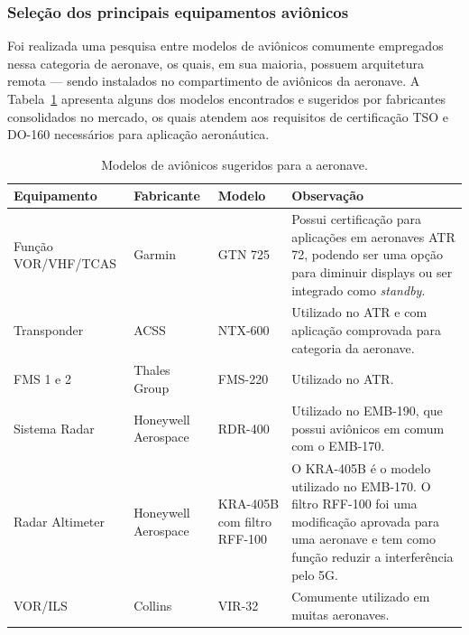 \subsubsection{Seleção dos principais equipamentos aviônicos}

Foi realizada uma pesquisa entre modelos de aviônicos comumente
empregados nessa categoria de aeronave, os quais, em sua maioria, possuem
arquitetura remota --- sendo instalados no compartimento de aviônicos da
aeronave. A Tabela~\ref{tab:modelos_avionicos} apresenta alguns dos modelos
encontrados e sugeridos por fabricantes consolidados no mercado, os quais
atendem aos requisitos de certificação TSO e DO-160 necessários para aplicação
aeronáutica.

\begin{table}[H]
    \centering
    \caption{Modelos de aviônicos sugeridos para a aeronave.}
    \label{tab:modelos_avionicos}
    
    \renewcommand{\arraystretch}{1.25}
    \setlength{\tabcolsep}{6pt}
    
    \begin{tabular}{|p{}|p{}|p{}|p{}|}
        \hline
        
        \textbf{Equipamento} &
        \textbf{Fabricante} &
        \textbf{Modelo} &
        \textbf{Observação} \\
        \hline
        
        Função VOR/VHF/TCAS &
        Garmin &
        GTN 725 &
        Possui certificação para aplicações em aeronaves ATR 72, podendo ser uma opção para diminuir displays ou ser integrado como \textit{standby}. \\
        \hline
        
        Transponder &
        ACSS &
        NTX-600 &
        Utilizado no ATR e com aplicação comprovada para categoria da aeronave. \\
        \hline
        
        FMS 1 e 2 &
        Thales Group &
        FMS-220 &
        Utilizado no ATR. \\
        \hline
        
        Sistema Radar &
        Honeywell Aerospace &
        RDR-400 &
        Utilizado no EMB-190, que possui aviônicos em comum com o EMB-170. \\
        \hline
        
        Radar Altimeter &
        Honeywell Aerospace &
        KRA-405B com filtro RFF-100 &
        O KRA-405B é o modelo utilizado no EMB-170. O filtro RFF-100 foi uma modificação aprovada para uma aeronave e tem como função reduzir a interferência pelo 5G. \\
        \hline
        
        VOR/ILS &
        Collins &
        VIR-32 &
        Comumente utilizado em muitas aeronaves. \\
        \hline
        
    \end{tabular}
\end{table}


